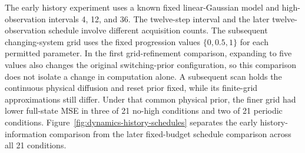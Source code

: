 \documentclass[11pt,a4paper]{article}
\begin{document}
The early history experiment uses a known fixed linear-Gaussian model and high-observation intervals 4, 12, and 36. The twelve-step interval and the later twelve-observation schedule involve different acquisition counts. The subsequent changing-system grid uses the fixed progression values $\{0,0.5,1\}$ for each permitted parameter. In the first grid-refinement comparison, expanding to five values also changes the original switching-prior configuration, so this comparison does not isolate a change in computation alone. A subsequent scan holds the continuous physical diffusion and reset prior fixed, while its finite-grid approximations still differ. Under that common physical prior, the finer grid had lower full-state MSE in three of 21 no-high conditions and two of 21 periodic conditions. Figure~\ref{fig:dynamics-history-schedules} separates the early history-information comparison from the later fixed-budget schedule comparison across all 21 conditions.
\end{document}
